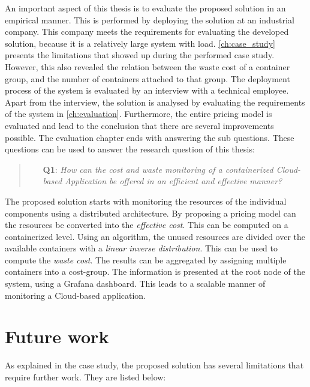 \noindent
An important aspect of this thesis is to evaluate the proposed solution in an empirical manner. This is performed by deploying the solution at an industrial company. This company meets the requirements for evaluating the developed solution, because it is a relatively large system with load. \autoref{ch:case_study} presents the limitations that showed up during the performed case study. However, this also revealed the relation between the waste cost of a container group, and the number of containers attached to that group. The deployment process of the system is evaluated by an interview with a technical employee.\\

\noindent
Apart from the interview, the solution is analysed by evaluating the requirements of the system in \autoref{ch:evaluation}. Furthermore, the entire pricing model is evaluated and lead to the conclusion that there are several improvements possible. The evaluation chapter ends with answering the sub questions. These questions can be used to answer the research question of this thesis:

\begin{quote}
    \begin{itemize}
        \item[\textbf{Q1}: ]\textit{How can the cost and waste monitoring of a containerized Cloud-based Application be offered in an efficient and effective manner?}
    \end{itemize}
\end{quote}

\noindent
The proposed solution starts with monitoring the resources of the individual components using a distributed architecture. By proposing a pricing model can the resources be converted into the \textit{effective cost}. This can be computed on a containerized level. Using an algorithm, the unused resources are divided over the available containers with a \textit{linear inverse distribution}. This can be used to compute the \textit{waste cost}. The results can be aggregated by assigning multiple containers into a cost-group. The information is presented at the root node of the system, using a Grafana dashboard. This leads to a scalable manner of monitoring a Cloud-based application.

\section{Future work} \label{sec:future_work}
As explained in the case study, the proposed solution has several limitations that require further work. They are listed below:

